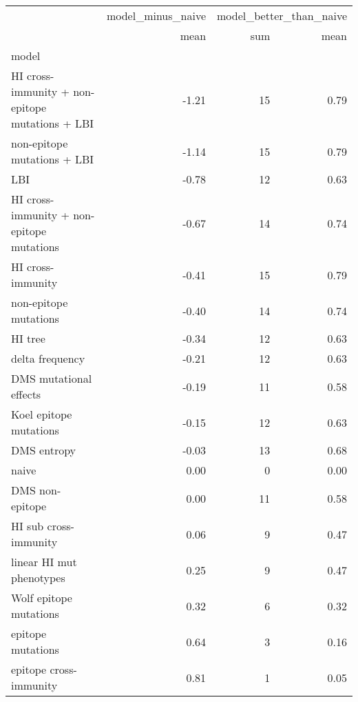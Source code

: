 \begin{tabular}{lrrr}
\toprule
{} & model\_minus\_naive & \multicolumn{2}{l}{model\_better\_than\_naive} \\
{} &              mean &                     sum & mean \\
model                                           &                   &                         &      \\
\midrule
HI cross-immunity + non-epitope mutations + LBI &             -1.21 &                      15 & 0.79 \\
non-epitope mutations + LBI                     &             -1.14 &                      15 & 0.79 \\
LBI                                             &             -0.78 &                      12 & 0.63 \\
HI cross-immunity + non-epitope mutations       &             -0.67 &                      14 & 0.74 \\
HI cross-immunity                               &             -0.41 &                      15 & 0.79 \\
non-epitope mutations                           &             -0.40 &                      14 & 0.74 \\
HI tree                                         &             -0.34 &                      12 & 0.63 \\
delta frequency                                 &             -0.21 &                      12 & 0.63 \\
DMS mutational effects                          &             -0.19 &                      11 & 0.58 \\
Koel epitope mutations                          &             -0.15 &                      12 & 0.63 \\
DMS entropy                                     &             -0.03 &                      13 & 0.68 \\
naive                                           &              0.00 &                       0 & 0.00 \\
DMS non-epitope                                 &              0.00 &                      11 & 0.58 \\
HI sub cross-immunity                           &              0.06 &                       9 & 0.47 \\
linear HI mut phenotypes                        &              0.25 &                       9 & 0.47 \\
Wolf epitope mutations                          &              0.32 &                       6 & 0.32 \\
epitope mutations                               &              0.64 &                       3 & 0.16 \\
epitope cross-immunity                          &              0.81 &                       1 & 0.05 \\
\bottomrule
\end{tabular}
